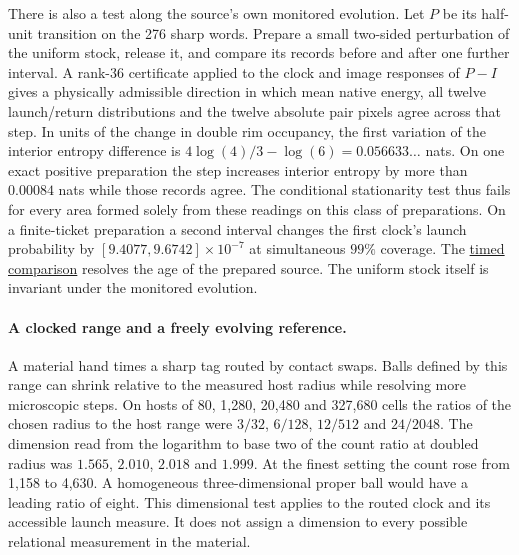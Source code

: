 \documentclass[11pt]{article}
\begin{document}
There is also a test along the source's own monitored evolution. Let
$P$ be its half-unit transition on the 276 sharp words. Prepare a
small two-sided perturbation of the uniform stock, release it, and
compare its records before and after one further interval. A rank-36
certificate applied to the clock and image responses of $P-I$ gives
a physically admissible direction in which mean native energy, all
twelve launch/return distributions and the twelve absolute pair
pixels agree across that step. In units of the change in double
rim occupancy, the first variation of the interior entropy difference
is $4\log(4)/3-\log(6)=0.056633\ldots$ nats. On one exact positive
preparation the step increases interior entropy by more than
$0.00084$ nats while those records agree. The conditional
stationarity test thus fails for every area formed solely from these
readings on this class of preparations. On a finite-ticket preparation
a second interval changes the first clock's launch probability by
$[9.4077,9.6742]\times10^{-7}$ at simultaneous $99\%$ coverage. The
\href{https://github.com/FloatingPragma/observer-patch-holography/tree/main/model/experiments/interval_echo_einstein_station/equilibrium_refinement/area_survey/joint_screen/relaxation}{timed comparison}
resolves the age of the prepared source. The uniform stock itself is
invariant under the monitored evolution.

\paragraph{A clocked range and a freely evolving reference.}
A material hand times a sharp tag routed by contact swaps. Balls defined
by this range can shrink relative to the measured host radius while
resolving more microscopic steps. On hosts of 80, 1,280, 20,480 and
327,680 cells the ratios of the chosen radius to the host range were
$3/32$, $6/128$, $12/512$ and $24/2048$. The dimension read from the
logarithm to base two of the count ratio at doubled radius was $1.565$,
$2.010$, $2.018$ and $1.999$. At the finest setting the count rose from
1,158 to 4,630. A homogeneous three-dimensional proper ball would have
a leading ratio of eight. This dimensional test applies to the routed
clock and its accessible launch measure. It does not assign a dimension
to every possible relational measurement in the material.
\end{document}
